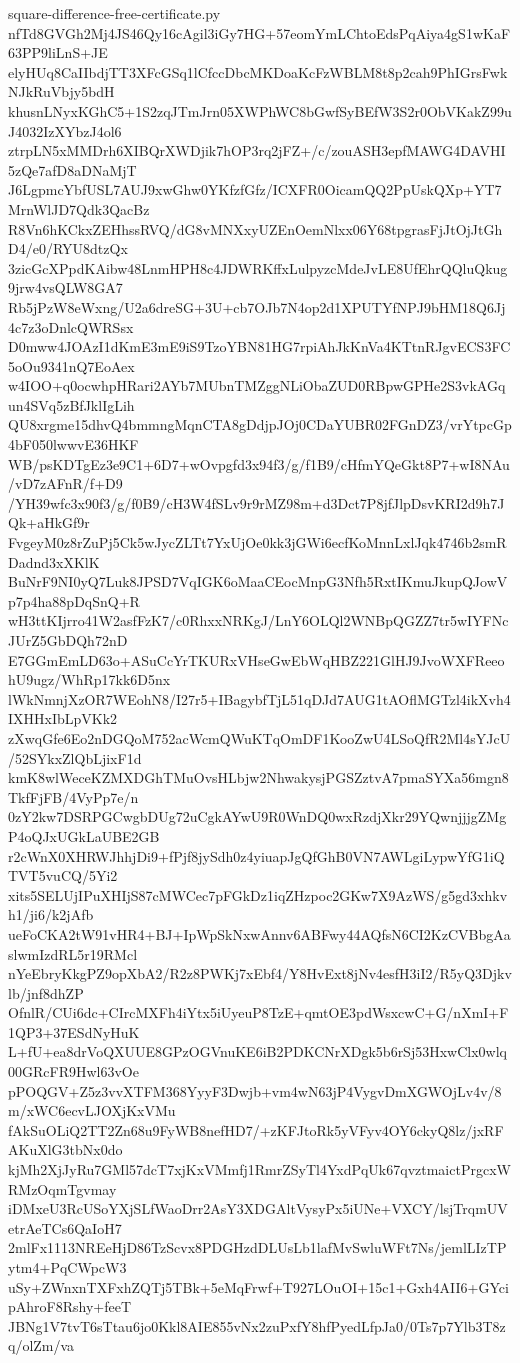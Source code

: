 \documentclass[11pt]{article}
\theoremstyle{definition}
\theoremstyle{remark}
\begin{document}
\begin{filecontents*}[overwrite]{square-difference-free-certificate.py}
nfTd8GVGh2Mj4JS46Qy16cAgil3iGy7HG+57eomYmLChtoEdsPqAiya4gS1wKaF63PP9liLnS+JE
elyHUq8CaIIbdjTT3XFcGSq1lCfccDbcMKDoaKcFzWBLM8t8p2cah9PhIGrsFwkNJkRuVbjy5bdH
khusnLNyxKGhC5+1S2zqJTmJrn05XWPhWC8bGwfSyBEfW3S2r0ObVKakZ99uJ4032IzXYbzJ4ol6
ztrpLN5xMMDrh6XIBQrXWDjik7hOP3rq2jFZ+/c/zouASH3epfMAWG4DAVHI5zQe7afD8aDNaMjT
J6LgpmcYbfUSL7AUJ9xwGhw0YKfzfGfz/ICXFR0OicamQQ2PpUskQXp+YT7MrnWlJD7Qdk3QacBz
R8Vn6hKCkxZEHhssRVQ/dG8vMNXxyUZEnOemNlxx06Y68tpgrasFjJtOjJtGhD4/e0/RYU8dtzQx
3zicGcXPpdKAibw48LnmHPH8c4JDWRKffxLulpyzcMdeJvLE8UfEhrQQluQkug9jrw4vsQLW8GA7
Rb5jPzW8eWxng/U2a6dreSG+3U+cb7OJb7N4op2d1XPUTYfNPJ9bHM18Q6Jj4c7z3oDnlcQWRSsx
D0mww4JOAzI1dKmE3mE9iS9TzoYBN81HG7rpiAhJkKnVa4KTtnRJgvECS3FC5oOu9341nQ7EoAex
w4IOO+q0ocwhpHRari2AYb7MUbnTMZggNLiObaZUD0RBpwGPHe2S3vkAGqun4SVq5zBfJklIgLih
QU8xrgme15dhvQ4bmmngMqnCTA8gDdjpJOj0CDaYUBR02FGnDZ3/vrYtpcGp4bF050lwwvE36HKF
WB/psKDTgEz3e9C1+6D7+wOvpgfd3x94f3/g/f1B9/cHfmYQeGkt8P7+wI8NAu/vD7zAFnR/f+D9
/YH39wfc3x90f3/g/f0B9/cH3W4fSLv9r9rMZ98m+d3Dct7P8jfJlpDsvKRI2d9h7JQk+aHkGf9r
FvgeyM0z8rZuPj5Ck5wJycZLTt7YxUjOe0kk3jGWi6ecfKoMnnLxlJqk4746b2smRDadnd3xXKlK
BuNrF9NI0yQ7Luk8JPSD7VqIGK6oMaaCEocMnpG3Nfh5RxtIKmuJkupQJowVp7p4ha88pDqSnQ+R
wH3ttKIjrro41W2asfFzK7/c0RhxxNRKgJ/LnY6OLQl2WNBpQGZZ7tr5wIYFNcJUrZ5GbDQh72nD
E7GGmEmLD63o+ASuCcYrTKURxVHseGwEbWqHBZ221GlHJ9JvoWXFReeohU9ugz/WhRp17kk6D5nx
lWkNmnjXzOR7WEohN8/I27r5+IBagybfTjL51qDJd7AUG1tAOflMGTzl4ikXvh4IXHHxIbLpVKk2
zXwqGfe6Eo2nDGQoM752acWcmQWuKTqOmDF1KooZwU4LSoQfR2Ml4sYJcU/52SYkxZlQbLjixF1d
kmK8wlWeceKZMXDGhTMuOvsHLbjw2NhwakysjPGSZztvA7pmaSYXa56mgn8TkfFjFB/4VyPp7e/n
0zY2kw7DSRPGCwgbDUg72uCgkAYwU9R0WnDQ0wxRzdjXkr29YQwnjjjgZMgP4oQJxUGkLaUBE2GB
r2cWnX0XHRWJhhjDi9+fPjf8jySdh0z4yiuapJgQfGhB0VN7AWLgiLypwYfG1iQTVT5vuCQ/5Yi2
xits5SELUjIPuXHIjS87cMWCec7pFGkDz1iqZHzpoc2GKw7X9AzWS/g5gd3xhkvh1/ji6/k2jAfb
ueFoCKA2tW91vHR4+BJ+IpWpSkNxwAnnv6ABFwy44AQfsN6CI2KzCVBbgAaslwmIzdRL5r19RMcl
nYeEbryKkgPZ9opXbA2/R2z8PWKj7xEbf4/Y8HvExt8jNv4esfH3iI2/R5yQ3Djkvlb/jnf8dhZP
OfnlR/CUi6dc+CIrcMXFh4iYtx5iUyeuP8TzE+qmtOE3pdWsxcwC+G/nXmI+F1QP3+37ESdNyHuK
L+fU+ea8drVoQXUUE8GPzOGVnuKE6iB2PDKCNrXDgk5b6rSj53HxwClx0wlq00GRcFR9Hwl63vOe
pPOQGV+Z5z3vvXTFM368YyyF3Dwjb+vm4wN63jP4VygvDmXGWOjLv4v/8m/xWC6ecvLJOXjKxVMu
fAkSuOLiQ2TT2Zn68u9FyWB8nefHD7/+zKFJtoRk5yVFyv4OY6ckyQ8lz/jxRFAKuXlG3tbNx0do
kjMh2XjJyRu7GMl57dcT7xjKxVMmfj1RmrZSyTl4YxdPqUk67qvztmaictPrgcxWRMzOqmTgvmay
iDMxeU3RcUSoYXjSLfWaoDrr2AsY3XDGAltVysyPx5iUNe+VXCY/lsjTrqmUVetrAeTCs6QaIoH7
2mlFx1113NREeHjD86TzScvx8PDGHzdDLUsLb1lafMvSwluWFt7Ns/jemlLIzTPytm4+PqCWpcW3
uSy+ZWnxnTXFxhZQTj5TBk+5eMqFrwf+T927LOuOI+15c1+Gxh4AII6+GYcipAhroF8Rshy+feeT
JBNg1V7tvT6sTtau6jo0Kkl8AIE855vNx2zuPxfY8hfPyedLfpJa0/0Ts7p7Ylb3T8zq/olZm/va

\end{filecontents*}
\end{document}

